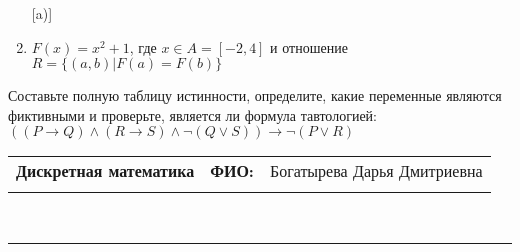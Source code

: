 \documentclass[10pt]{exam}
\newcommand{\class}{Дискретная математика}
\newcommand{\examdate}{}
\begin{document}
\begin{questions}
\begin{enumerate} [a)]
\item $F(x)=x^{2}+1$, где $x \in A = [-2, 4]$ и отношение $R = \{(a,b)|F(a) = F(b)\}$
\end{enumerate}\question Составьте полную таблицу истинности, определите, какие переменные являются фиктивными и проверьте, является ли формула тавтологией:
$((P \rightarrow Q) \land (R \rightarrow S) \land \neg (Q \lor S)) \rightarrow \neg (P \lor R)$

\end{questions}
\newpage
\begin{flushright}
\begin{tabular}{p{2.8in} r l}
\textbf{\class} & \textbf{ФИО:} &Богатырева Дарья Дмитриевна
\\

\textbf{\examdate} &&\\
\end{tabular}\\
\end{flushright}
\rule[1ex]{\textwidth}{.1pt}
\end{document}
